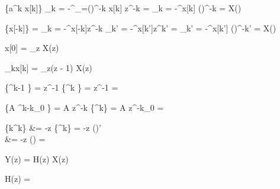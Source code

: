 \documentclass[parskip=half]{scrreprt}
\begin{document}
\begin{abox}
	\{a^k \cdot x[k]\}  \sum_{k = -\infty}^{\infty}_{=()^{-k}} \cdot x[k] \cdot z^{-k} = \sum_{k = -\infty}^{\infty}x[k] \cdot \left(\right)^{-k} = X\left(\right)
\end{abox}

\begin{abox}
	\{x[-k]\} = \sum_{k = -\infty}^{\infty}x[-k]z^{-k}  \sum_{k' = -\infty}^{\infty}x[k']z^{k'} = \sum_{k' = -\infty}^{\infty}x[k'] \cdot \left(\right)^{-k'} = X\left(\right)
\end{abox}

\begin{abox}
	x[0] = \lim\limits_{z \rightarrow \infty} X(z)
\end{abox}

\begin{abox}
	\lim\limits_{k\rightarrow\infty}x[k] = \lim\limits_{z}(z - 1) \cdot X(z)
\end{abox}

\begin{abox}
	\{\alpha^{k-1} \cdot \epsilon[k-1]\} = z^{-1} \cdot {}\{\alpha^k \cdot \epsilon[k]\} = z^{-1} \cdot {} = 
\end{abox}

\begin{abox}
	\{A \cdot\alpha^{k-k_0} \cdot\epsilon[k - k_0]\} = A \cdot z^{-k} \cdot {}\{\alpha^k\epsilon[k]\} = A \cdot z^{-k_0} \cdot {} = 
\end{abox}

\begin{abox}
	\{k\cdot\alpha^k\cdot\epsilon[k]\} &= -z \cdot {}\{\alpha^k\epsilon[k]\} = -z \cdot \left(\right)' \\
	&= -z \cdot \left(\right) = 
\end{abox}

\begin{abox}
	Y(z) = H(z) \cdot X(z)
\end{abox}

\begin{abox}
	H(z) = 
\end{abox}
\end{document}
